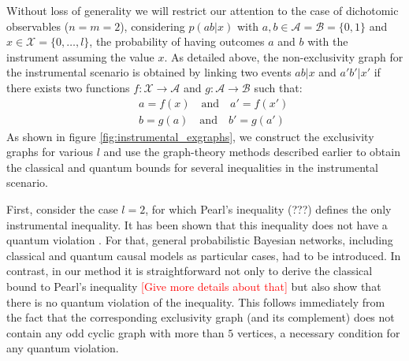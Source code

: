 \documentclass[letterpaper]{article}
\begin{document}
Without loss of generality we will restrict our attention to the case of dichotomic observables ($n = m = 2$), considering $p(ab|x)$ with $a, b \in \mathcal{A} = \mathcal{B} = \{0,1\}$ and $x \in
\mathcal{X} = \{0,\ldots,l\}$, the probability of having outcomes $a$ and $b$ with the instrument assuming the value $x$. As detailed above, the non-exclusivity graph for the instrumental scenario is obtained by linking two events $ab|x$ and $a'b'|x'$ if there exists two functions $f:\mathcal{X} \rightarrow \mathcal{A}$ and $g:\mathcal{A} \rightarrow
\mathcal{B}$ such that:
\begin{eqnarray}
   & &  a = f(x) \quad\text{and}\quad a'=f(x')\\ \nonumber
& & b = g(a) \quad\text{and}\quad b'=g(a')
    \label{eq:non_exclusivity_condition}
\end{eqnarray}
As shown in figure \ref{fig:instrumental_exgraphs}, we construct the exclusivity graphs for various $l$ and use the graph-theory methods described earlier to obtain the classical and quantum bounds for several inequalities in the instrumental scenario. 

First, consider the case $l=2$, for which Pearl's inequality (???) defines the only instrumental inequality. It has been shown that this inequality does not have a quantum violation \cite{}. For that, general probabilistic Bayesian networks, including classical and quantum causal models as particular cases, had to be introduced. In contrast, in our method it is straightforward not only to derive the classical bound to Pearl's inequality \textcolor{red}{[Give more details about that]} but also show that there is no quantum violation of the inequality. This follows immediately from the fact that the corresponding exclusivity graph (and its complement) does not contain any odd cyclic graph with more than $5$ vertices, a necessary condition for any quantum violation.  
\end{document}
